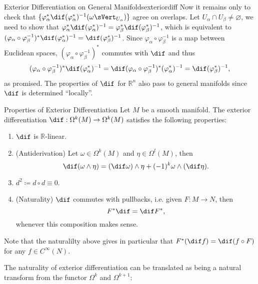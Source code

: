 \documentclass[11pt, a3paper, openany]{article}
\theoremstyle{remark}
\theoremstyle{remark}
\theoremstyle{remark}
\newenvironment{Proof of claim}
  {\begin{proof}[\normalfont \textbf{Proof of claim}]}
  {\end{proof}}
\theoremstyle{definition}
\theoremstyle{remark}
\theoremstyle{plain}
\begin{document}
\begin{Remark}{Exterior Differentiation on General Manifolds}{exteriordiff}
Now it remains only to check that $\{ \varphi_\alpha^*\dif(\varphi_\alpha^*)^{-1}(\omega\sVert_{U_\alpha})\}$ agree on overlaps. Let $U_\alpha\cap U_\beta\neq \varnothing$, we need to show that $\varphi_\alpha^*\dif(\varphi_\alpha^*)^{-1}= \varphi_\beta^*\dif(\varphi_\beta^*)^{-1}$, which is equivalent to $ (\varphi_\alpha\circ \varphi_{\beta}^{-1})^*\dif(\varphi_\alpha^*)^{-1}= \dif(\varphi_\beta^*)^{-1} $. Since $ \varphi_\alpha\circ \varphi_{\beta}^{-1}$ is a map between Euclidean spaces, $(\varphi_\alpha\circ \varphi_{\beta}^{-1})^* $ commutes with $\dif$ and thus
\begin{equation}
    (\varphi_\alpha\circ \varphi_{\beta}^{-1})^*\dif(\varphi_\alpha^*)^{-1}=\dif (\varphi_\alpha\circ \varphi_{\beta}^{-1})^*(\varphi_\alpha^*)^{-1}=\dif (\varphi_\beta^*)^{-1},
\end{equation}
as promised. The properties of $\dif$ for $\mathbb{R}^n$ also pass to general manifolds since $\dif$ is determined ``locally''.
\begin{Proposition}{Properties of Exterior Differentiation}{}
Let $M$ be a smooth manifold. The exterior differentiation $\dif:\Omega^k(M)\to\Omega^k(M)$ satisfies the following properties:
\begin{enumerate}[label=(\alph*)]
    \item $\dif$ is $\mathbb{R}$-linear.
    \item (Antiderivation) Let $\omega\in \Omega^k(M)$ and $\eta\in \Omega^l(M)$, then
    \begin{equation*}
        \dif (\omega\wedge\eta)=(\dif\omega)\wedge\eta+(-1)^k\omega\wedge(\dif\eta).
    \end{equation*}
    \item $d^2\coloneqq d\circ d\equiv 0$.
    \item (Naturality) $\dif $ commutes with pullbacks, i.e. given $F:M\to N$, then
    \begin{equation*}
        F^*\dif=\dif F^*,
    \end{equation*}
    whenever this composition makes sense.
\end{enumerate}
\end{Proposition}

Note that the naturalilty above gives in particular that $F^*(\dif f) = \dif (f\circ F)$ for any $f\in C^\infty(N)$.

The naturality of exterior differentiation can be translated as being a natural transform from the functor $\Omega^k$ and $\Omega^{k+1}$:
\begin{center}
\end{center}
\end{Remark}
\end{document}

